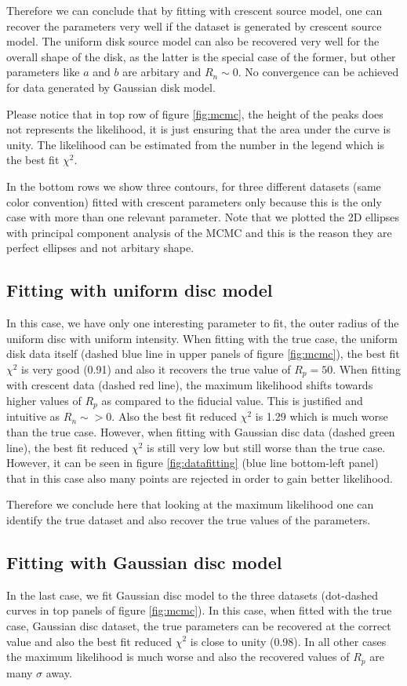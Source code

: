 Therefore we can conclude that by fitting with crescent source model, one can recover the parameters very well if the dataset is generated by crescent source model. The uniform disk source model can also be recovered very well for the overall shape of the disk, as the latter is the special case of the former, but other parameters like $a$ and $b$ are arbitary and $R_n \sim 0$. No convergence can be achieved for data generated by Gaussian disk model. 

Please notice that in top row of figure \ref{fig:mcmc}, the height of the peaks does not represents the likelihood, it is just ensuring that the area under the curve is unity. The likelihood can be estimated from the number in the legend which is the best fit $\chi^2$.


 In the bottom rows we show three contours, for three different datasets (same color convention) fitted with crescent parameters only because this is the only case with more than one relevant parameter. Note that we plotted the 2D ellipses with principal component analysis of the MCMC and this is the reason they are perfect ellipses and not arbitary shape.

\subsection{Fitting with uniform disc model}
In this case, we have only one interesting parameter to fit, the outer radius of the uniform disc with uniform intensity. When fitting with the true case, the uniform disk data itself (dashed blue line in upper panels of figure \ref{fig:mcmc}), the best fit $\chi^2$ is very good (0.91) and also it recovers the true value of $R_p=50$. When fitting with crescent data (dashed red line), the maximum likelihood shifts towards higher values of $R_p$ as compared to the fiducial value. This is justified and intuitive as $R_n \sim > 0$. Also the best fit reduced $\chi^2$ is 1.29 which is much worse than the true case. However, when fitting with Gaussian disc data (dashed green line), the best fit reduced $\chi^2$ is still very low but still worse than the true case. However, it can be seen in figure \ref{fig:datafitting} (blue line bottom-left panel) that in this case also many points are rejected in order to gain better likelihood.

Therefore we conclude here that looking at the maximum likelihood one can identify the true dataset and also recover the true values of the parameters. 


\subsection{Fitting with Gaussian disc model}
In the last case, we fit Gaussian disc model to the three datasets (dot-dashed curves in top panels of figure \ref{fig:mcmc}). In this case, when fitted with the true case, Gaussian disc dataset, the true parameters can be recovered at the correct value and also the best fit reduced $\chi^2$ is close to unity (0.98). In all other cases the maximum likelihood is much worse and also the recovered values of $R_p$ are many $\sigma$ away.

